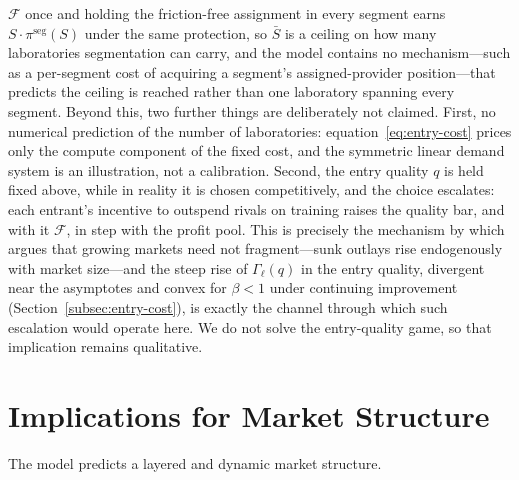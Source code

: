 \documentclass[11pt]{article}
\begin{document}
$\mathcal F$ once and holding the friction-free assignment in every segment earns $S\cdot\pi^{\mathrm{seg}}(S)$ under the same protection, so $\bar S$ is a ceiling on how many laboratories segmentation can carry, and the model contains no mechanism---such as a per-segment cost of acquiring a segment's assigned-provider position---that predicts the ceiling is reached rather than one laboratory spanning every segment. Beyond this, two further things are deliberately not claimed. First, no numerical prediction of the number of laboratories: equation~\eqref{eq:entry-cost} prices only the compute component of the fixed cost, and the symmetric linear demand system is an illustration, not a calibration. Second, the entry quality $q$ is held fixed above, while in reality it is chosen competitively, and the choice escalates: each entrant's incentive to outspend rivals on training raises the quality bar, and with it $\mathcal F$, in step with the profit pool. This is precisely the mechanism by which \citet{sutton1991} argues that growing markets need not fragment---sunk outlays rise endogenously with market size---and the steep rise of $\Gamma_\ell(q)$ in the entry quality, divergent near the asymptotes and convex for $\beta<1$ under continuing improvement (Section~\ref{subsec:entry-cost}), is exactly the channel through which such escalation would operate here. We do not solve the entry-quality game, so that implication remains qualitative.

\section{Implications for Market Structure}
\label{sec:implications}

The model predicts a layered and dynamic market structure.
\end{document}
